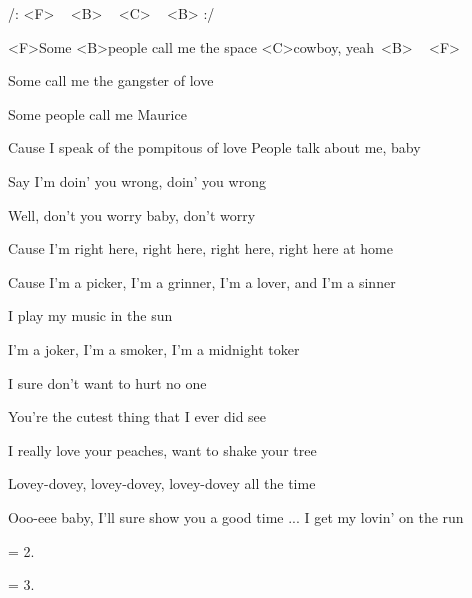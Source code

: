 
/: <F> ~ <B> ~ <C> ~ <B> :/

\zs
<F>Some <B>people call me the space <C>cowboy, yeah~<B> ~ <F>

Some call me the gangster of love

Some people call me Maurice

Cause I speak of the pompitous of love
\ks
\zs
People talk about me, baby

Say I'm doin' you wrong, doin' you wrong

Well, don't you worry baby, don't worry

Cause I'm right here, right here, right here, right here at home
\ks

\zr
Cause I'm a picker, I'm a grinner, I'm a lover, and I'm a sinner

I play my music in the sun
\bigskip

I'm a joker, I'm a smoker, I'm a midnight toker

I sure don't want to hurt no one
\kr

\zs
You're the cutest thing that I ever did see

I really love your peaches, want to shake your tree

Lovey-dovey, lovey-dovey, lovey-dovey all the time

Ooo-eee baby, I'll sure show you a good time
\ks
\zr
... I get my lovin' on the run
\kr

\zr\kr

\zs
= 2.
\ks

\zs
= 3.
\ks
\kp
